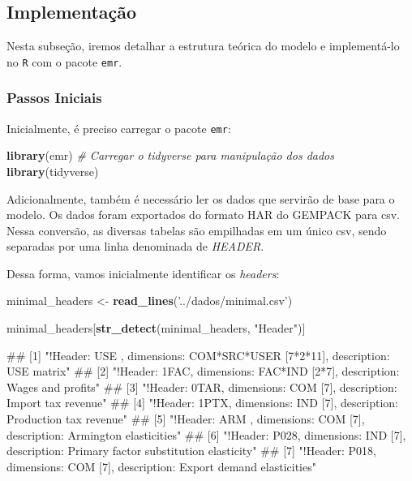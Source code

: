 \documentclass[12pt,twoside]{article}
\newenvironment{Shaded}{\begin{snugshade}}{\end{snugshade}}
\newcommand{\CommentTok}[1]{\textcolor[rgb]{0.56,0.35,0.01}{\textit{#1}}}
\newcommand{\KeywordTok}[1]{\textcolor[rgb]{0.13,0.29,0.53}{\textbf{#1}}}
\newcommand{\NormalTok}[1]{#1}
\newcommand{\StringTok}[1]{\textcolor[rgb]{0.31,0.60,0.02}{#1}}
\let\oldShaded\Shaded
\let\endoldShaded\endShaded
\renewenvironment{Shaded}{\footnotesize\oldShaded}{\endoldShaded}
\let\oldverbatim\verbatim
\let\endoldverbatim\endverbatim
\renewenvironment{verbatim}{\footnotesize\oldverbatim}{\endoldverbatim}
\begin{document}
\hypertarget{implementauxe7uxe3o}{%
\subsection{Implementação}\label{implementauxe7uxe3o}}

Nesta subseção, iremos detalhar a estrutura teórica do modelo e
implementá-lo no \texttt{R} com o pacote \texttt{emr}.

\hypertarget{passos-iniciais}{%
\subsubsection{Passos Iniciais}\label{passos-iniciais}}

Inicialmente, é preciso carregar o pacote \texttt{emr}:

\begin{Shaded}
\begin{Highlighting}[]
\KeywordTok{library}\NormalTok{(emr)}
\CommentTok{# Carregar o tidyverse para manipulação dos dados}
\KeywordTok{library}\NormalTok{(tidyverse)}
\end{Highlighting}
\end{Shaded}

Adicionalmente, também é necessário ler os dados que servirão de base
para o modelo. Os dados foram exportados do formato HAR do GEMPACK para
csv. Nessa conversão, as diversas tabelas são empilhadas em um único
csv, sendo separadas por uma linha denominada de \emph{HEADER}.

Dessa forma, vamos inicialmente identificar os \emph{headers}:

\begin{Shaded}
\begin{Highlighting}[]
\NormalTok{minimal_headers <-}\StringTok{ }\KeywordTok{read_lines}\NormalTok{(}\StringTok{'../dados/minimal.csv'}\NormalTok{)}

\NormalTok{minimal_headers[}\KeywordTok{str_detect}\NormalTok{(minimal_headers, }\StringTok{"Header"}\NormalTok{)]}
\end{Highlighting}
\end{Shaded}

\begin{verbatim}
## [1] "!Header: USE , dimensions: COM*SRC*USER [7*2*11], description: USE matrix"              
## [2] "!Header: 1FAC, dimensions: FAC*IND [2*7], description: Wages and profits"               
## [3] "!Header: 0TAR, dimensions: COM [7], description: Import tax revenue"                    
## [4] "!Header: 1PTX, dimensions: IND [7], description: Production tax revenue"                
## [5] "!Header: ARM , dimensions: COM [7], description: Armington elasticities"                
## [6] "!Header: P028, dimensions: IND [7], description: Primary factor substitution elasticity"
## [7] "!Header: P018, dimensions: COM [7], description: Export demand elasticities"
\end{verbatim}
\end{document}
